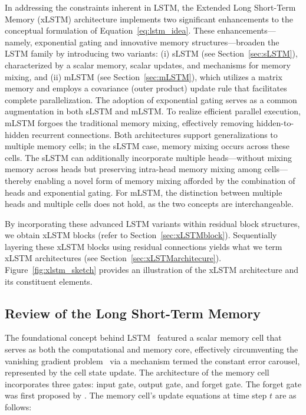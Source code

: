 In addressing the constraints inherent in LSTM, the Extended Long Short-Term Memory (xLSTM) architecture implements two significant enhancements to the conceptual formulation of Equation~\eqref{eq:lstm_idea}. These enhancements—namely, exponential gating and innovative memory structures—broaden the LSTM family by introducing two variants: (i) sLSTM (see Section~\ref{sec:sLSTM}), characterized by a scalar memory, scalar updates, and mechanisms for memory mixing, and (ii) mLSTM (see Section~\ref{sec:mLSTM}), which utilizes a matrix memory and employs a covariance (outer product) update rule that facilitates complete parallelization. The adoption of exponential gating serves as a common augmentation in both sLSTM and mLSTM. To realize efficient parallel execution, mLSTM forgoes the traditional memory mixing, effectively removing hidden-to-hidden recurrent connections. Both architectures support generalizations to multiple memory cells; in the sLSTM case, memory mixing occurs across these cells. The sLSTM can additionally incorporate multiple heads—without mixing memory across heads but preserving intra-head memory mixing among cells—thereby enabling a novel form of memory mixing afforded by the combination of heads and exponential gating. For mLSTM, the distinction between multiple heads and multiple cells does not hold, as the two concepts are interchangeable.

By incorporating these advanced LSTM variants within residual block structures, we obtain xLSTM blocks (refer to Section~\ref{sec:xLSTMblock}). Sequentially layering these xLSTM blocks using residual connections yields what we term xLSTM architectures (see Section~\ref{sec:xLSTMarchitecure}).
Figure~\ref{fig:xlstm_sketch} provides an illustration of the xLSTM architecture and its constituent elements.

\subsection{Review of the Long Short-Term Memory}
\label{sec:orgLSTM}

The foundational concept behind LSTM~\citep{Hochreiter:91,Hochreiter:97nips,Hochreiter:97} featured a scalar memory cell that serves as both the computational and memory core, effectively circumventing the vanishing gradient problem~\citep{Hochreiter:91,Hochreiter:00book} via a mechanism termed the constant error carousel, represented by the cell state update. The architecture of the memory cell incorporates three gates: input gate, output gate, and forget gate. The forget gate was first proposed by \citet{Gers:00}. The memory cell’s update equations at time step $t$ are as follows:

